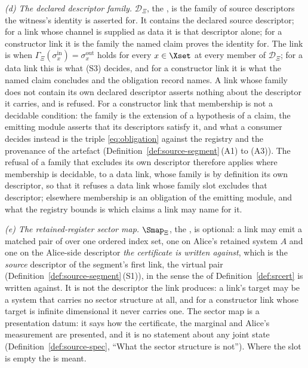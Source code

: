\begin{definition}
\emph{(d) The declared descriptor family.} $\mathcal{D}_{\Xi}$, the
, is the family of source descriptors the
witness's identity is asserted for. It contains the declared source
descriptor; for a link whose channel is supplied as data it is that
descriptor alone; for a constructor link it is the family the named claim
proves the identity for. The link is  when
$\Gamma_{\Xi}(\sigma^{\mathrm{in}}_x)=\sigma^{\mathrm{out}}_x$ holds for
every $x\in\Xset$ at every member of $\mathcal{D}_{\Xi}$; for a data link
this is what (S3) decides, and for a constructor link it is what the named
claim concludes and the obligation record names. A link whose family does not
contain its own declared descriptor asserts nothing about the descriptor it
carries, and is refused. For a constructor link that membership is not a
decidable condition: the family is the extension of a hypothesis of a claim,
the emitting module asserts that its descriptors satisfy it, and what a
consumer decides instead is the triple \eqref{eq:obligation} against the
registry and the provenance of the artefact
(Definition~\ref{def:source-segment}\,(A1) to (A3)). The refusal of a family
that excludes its own descriptor therefore applies where membership is
decidable, to a data link, whose family is by definition its own descriptor,
so that it refuses a data link whose family slot excludes that descriptor;
elsewhere
membership is an obligation of the emitting module, and what the registry
bounds is which claims a link may name for it.

\emph{(e) The retained-register sector map.} $\Smap_{\Xi}$, the
, is optional: a link may emit a matched
pair of  over one ordered index set, one on Alice's
retained system $A$ and one on the Alice-side descriptor \emph{the
certificate is written against}, which is the \emph{source} descriptor of the
segment's first link, the virtual pair
(Definition~\ref{def:source-segment}\,(S1)), in the sense the  of
Definition~\ref{def:srcert} is written against. It is
not the descriptor the link produces: a link's target may be a system that
carries no sector structure at all, and for a constructor link whose target
is infinite dimensional it never carries one. The sector map is a
presentation datum: it says how the certificate, the marginal and Alice's
measurement are presented, and it is no statement about any joint state
(Definition~\ref{def:source-spec}, ``What the sector structure is not'').
Where the slot is empty the  is meant.


\end{definition}
